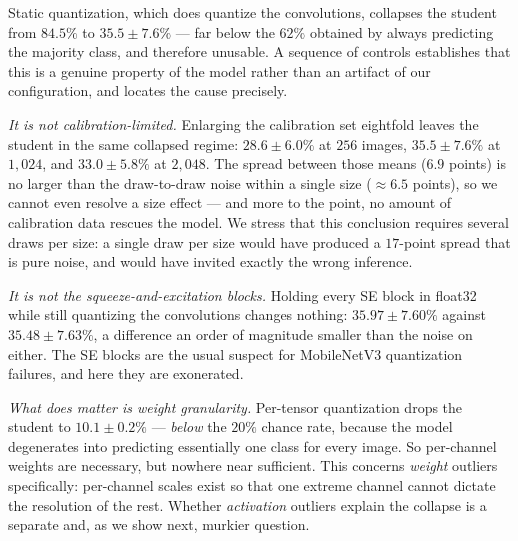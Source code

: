 \documentclass[conference]{IEEEtran}
\begin{document}
Static quantization, which does quantize the convolutions, collapses the student
from $84.5\%$ to $35.5\pm7.6\%$ --- far below the $62\%$ obtained by always
predicting the majority class, and therefore unusable. A sequence of controls
establishes that this is a genuine property of the model rather than an artifact
of our configuration, and locates the cause precisely.

\emph{It is not calibration-limited.} Enlarging the calibration set eightfold
leaves the student in the same collapsed regime: $28.6\pm6.0\%$ at $256$ images,
$35.5\pm7.6\%$ at $1{,}024$, and $33.0\pm5.8\%$ at $2{,}048$. The spread between
those means ($6.9$ points) is no larger than the draw-to-draw noise within a
single size ($\approx6.5$ points), so we cannot even resolve a size effect ---
and more to the point, no amount of calibration data rescues the model. We
stress that this conclusion requires several draws per size: a single draw per
size would have produced a $17$-point spread that is pure noise, and would have
invited exactly the wrong inference.

\emph{It is not the squeeze-and-excitation blocks.} Holding every SE block in
float32 while still quantizing the convolutions changes nothing:
$35.97\pm7.60\%$ against $35.48\pm7.63\%$, a difference an order of magnitude
smaller than the noise on either. The SE blocks are the usual suspect for
MobileNetV3 quantization failures, and here they are exonerated.

\emph{What does matter is weight granularity.} Per-tensor quantization drops the
student to $10.1\pm0.2\%$ --- \emph{below} the $20\%$ chance rate, because the
model degenerates into predicting essentially one class for every image. So
per-channel weights are necessary, but nowhere near sufficient. This concerns
\emph{weight} outliers specifically: per-channel scales exist so that one extreme
channel cannot dictate the resolution of the rest. Whether \emph{activation}
outliers explain the collapse is a separate and, as we show next, murkier
question.
\end{document}
